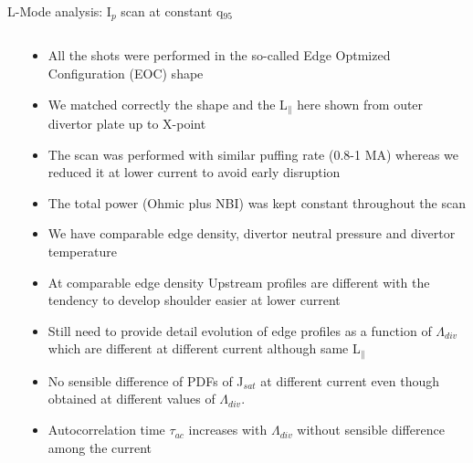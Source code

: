 \documentclass[10pt, compress]{beamer}
\newcommand\Fontvi{\fontsize{8}{7.2}\selectfont}
\begin{document}
\begin{frame}{L-Mode analysis: I$_p$ scan at constant q$_{95}$}
\Fontvi
  \vspace{-1cm}
\begin{columns}
  \begin{column}{0.65\textwidth}

  \end{column}
  \begin{column}{0.35\textwidth}
    \begin{itemize}
      \item<1|only@1> All the shots were performed in the so-called
        Edge Optmized Configuration (EOC) shape
      \item<1|only@1> We matched correctly the shape and the L$_{\parallel}$
        here shown from outer divertor plate up to X-point 
      \item<2|only@2> The scan was performed with similar puffing rate (0.8-1
        MA) whereas we reduced it at lower current to avoid early
        disruption
      \item<2|only@2> The total power (Ohmic plus NBI) was kept
        constant throughout the scan
      \item<2|only@2> We have comparable edge density, divertor neutral
        pressure and divertor temperature
      \item<3|only@3> At comparable edge density Upstream profiles are
        different with the tendency to develop shoulder easier at
        lower current
      \item<3|only@3> Still need to provide detail evolution of edge
        profiles as a function
        of $\Lambda_{div}$ which are different at different current
        although same L$_{\parallel}$
      \item<4|only@4> No sensible difference of PDFs of J$_{sat}$ at
        different current even though obtained at different values of $\Lambda_{div}$. 
      \item<4|only@4> Autocorrelation time $\tau_{ac}$ increases with
        $\Lambda_{div}$ without sensible difference among the current
      \end{itemize}
    \end{column}
\end{columns}
\end{frame}
\end{document}
